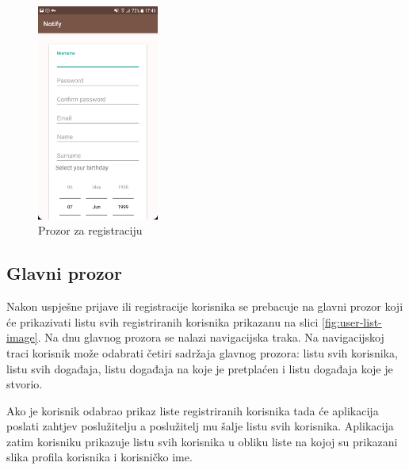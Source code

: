 \documentclass[times, utf8, zavrsni]{fer}
\begin{document}
{\begin{figure}[htb]
\centering
\includegraphics[width=4cm]{img/ss-register.png}
\caption{Prozor za registraciju}
\label{fig:register-image}
\end{figure}

\subsection{Glavni prozor}
Nakon uspješne prijave ili registracije korisnika se prebacuje na glavni prozor koji će prikazivati listu svih registriranih korisnika prikazanu na slici \ref{fig:user-list-image}. Na dnu glavnog prozora se nalazi navigacijska traka. Na navigacijskoj traci korisnik može odabrati četiri sadržaja glavnog prozora: listu svih korisnika, listu svih događaja, listu događaja na koje je pretplaćen i listu događaja koje je stvorio.

Ako je korisnik odabrao prikaz liste registriranih korisnika tada će aplikacija poslati zahtjev poslužitelju a poslužitelj mu šalje listu svih korisnika. Aplikacija zatim korisniku prikazuje listu svih korisnika u obliku liste na kojoj su prikazani slika profila korisnika i korisničko ime.

\begin{figure}
\centering


\end{figure}}
\end{document}
